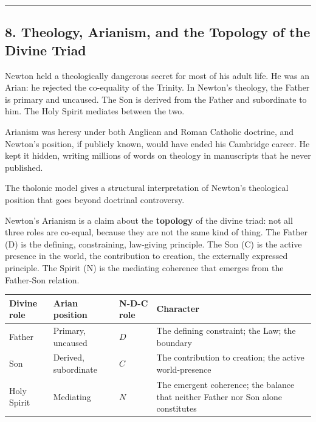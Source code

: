 \documentclass[
  11pt,
  letterpaper,
]{article}
\begin{document}
\begin{center}\rule{0.5\linewidth}{0.5pt}\end{center}

\subsection{8. Theology, Arianism, and the Topology of the Divine
Triad}\label{theology-arianism-and-the-topology-of-the-divine-triad}

Newton held a theologically dangerous secret for most of his adult life.
He was an Arian: he rejected the co-equality of the Trinity. In Newton's
theology, the Father is primary and uncaused. The Son is derived from
the Father and subordinate to him. The Holy Spirit mediates between the
two.

Arianism was heresy under both Anglican and Roman Catholic doctrine, and
Newton's position, if publicly known, would have ended his Cambridge
career. He kept it hidden, writing millions of words on theology in
manuscripts that he never published.

The tholonic model gives a structural interpretation of Newton's
theological position that goes beyond doctrinal controversy.

Newton's Arianism is a claim about the \textbf{topology} of the divine
triad: not all three roles are co-equal, because they are not the same
kind of thing. The Father (D) is the defining, constraining, law-giving
principle. The Son (C) is the active presence in the world, the
contribution to creation, the externally expressed principle. The Spirit
(N) is the mediating coherence that emerges from the Father-Son
relation.

\begin{longtable}[]{@{}
  >{\raggedright\arraybackslash}p{}
  >{\raggedright\arraybackslash}p{}
  >{\raggedright\arraybackslash}p{}
  >{\raggedright\arraybackslash}p{}@{}}
\toprule\noalign{}
\begin{minipage}[b]{\linewidth}\raggedright
Divine role
\end{minipage} & \begin{minipage}[b]{\linewidth}\raggedright
Arian position
\end{minipage} & \begin{minipage}[b]{\linewidth}\raggedright
N-D-C role
\end{minipage} & \begin{minipage}[b]{\linewidth}\raggedright
Character
\end{minipage} \\
\midrule\noalign{}
\endhead
\bottomrule\noalign{}
\endlastfoot
Father & Primary, uncaused & \(D\) & The defining constraint; the Law;
the boundary \\
Son & Derived, subordinate & \(C\) & The contribution to creation; the
active world-presence \\
Holy Spirit & Mediating & \(N\) & The emergent coherence; the balance
that neither Father nor Son alone constitutes \\
\end{longtable}
\end{document}
